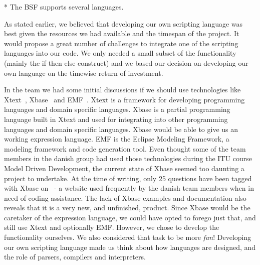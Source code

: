 * The BSF supports several languages.

As stated earlier, we believed that developing our own scripting language was best given the resources we had available and the timespan of the project. It would propose a great number of challenges to integrate one of the scripting languages into our code. We only needed a small subset of the functionality (mainly the if-then-else construct) and we based our decision on developing our own language on the timewise return of investment.

In the team we had some initial discussions if we should use technologies like Xtext~\cite{xtext}, Xbase~\cite{xbase} and EMF~\cite{emf}. Xtext is a framework for developing programming languages and domain specific languages. Xbase is a partial programming language built in Xtext and used for integrating into other programming languages and domain specific languages. Xbase would be able to give us an working expression language. EMF is the Eclipse Modeling Framework, a modeling framework and code generation tool. Even thought some of the team members in the danish group had used those technologies during the ITU course Model Driven Development, the current state of Xbase seemed too daunting a project to undertake. At the time of writing, only 25 questions have been tagged with Xbase on~\cite{stackoverflow} - a website used frequently by the danish team members when in need of coding assistance. The lack of Xbase examples and documentation also reveals that it is a very new, and unfinished, product. Since Xbase would be the caretaker of the expression language, we could have opted to forego just that, and still use Xtext and optionally EMF. However, we chose to develop the functionality ourselves. We also considered that task to be more \textit{fun}! Developing our own scripting language made us think about how languages are designed, and the role of parsers, compilers and interpreters.